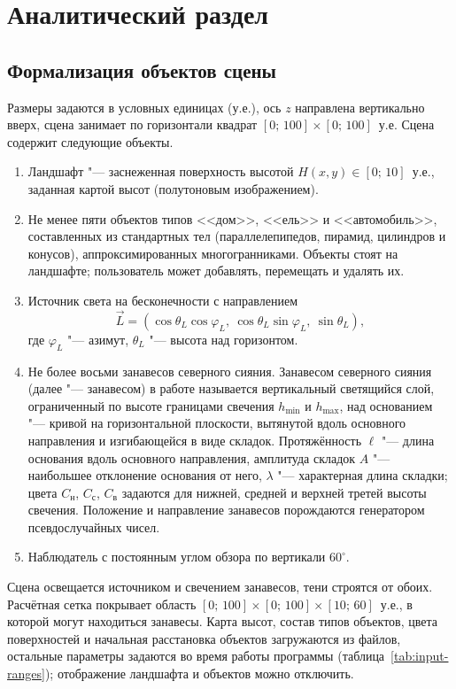 \chapter{Аналитический раздел}

\section{Формализация объектов сцены}

Размеры задаются в условных единицах (у.е.), ось $z$ направлена вертикально вверх, сцена занимает по горизонтали квадрат $[0;\,100] \times [0;\,100]$~у.е. Сцена содержит следующие объекты.
\begin{enumerate}
	\item Ландшафт "--- заснеженная поверхность высотой $H(x, y) \in [0;\,10]$~у.е., заданная картой высот (полутоновым изображением).
	\item Не менее пяти объектов типов <<дом>>, <<ель>> и <<автомобиль>>, составленных из стандартных тел (параллелепипедов, пирамид, цилиндров и конусов), аппроксимированных многогранниками. Объекты стоят на ландшафте; пользователь может добавлять, перемещать и удалять их.
	\item Источник света на бесконечности с направлением
	\begin{equation}
		\vec{L} = (\cos\theta_L \cos\varphi_L,\ \cos\theta_L \sin\varphi_L,\ \sin\theta_L),
		\label{eq:light-dir}
	\end{equation}
	где $\varphi_L$ "--- азимут, $\theta_L$ "--- высота над горизонтом.
	\item Не более восьми занавесов северного сияния. Занавесом северного сияния (далее "--- занавесом) в работе называется вертикальный светящийся слой, ограниченный по высоте границами свечения $h_{\min}$ и $h_{\max}$, над основанием "--- кривой на горизонтальной плоскости, вытянутой вдоль основного направления и изгибающейся в виде складок. Протяжённость $\ell$ "--- длина основания вдоль основного направления, амплитуда складок $A$ "--- наибольшее отклонение основания от него, $\lambda$ "--- характерная длина складки; цвета $C_{\text{н}}$, $C_{\text{с}}$, $C_{\text{в}}$ задаются для нижней, средней и верхней третей высоты свечения. Положение и направление занавесов порождаются генератором псевдослучайных чисел.
	\item Наблюдатель с постоянным углом обзора по вертикали $60^\circ$.
\end{enumerate}

Сцена освещается источником и свечением занавесов, тени строятся от обоих. Расчётная сетка покрывает область $[0;\,100] \times [0;\,100] \times [10;\,60]$~у.е., в которой могут находиться занавесы. Карта высот, состав типов объектов, цвета поверхностей и начальная расстановка объектов загружаются из файлов, остальные параметры задаются во время работы программы (таблица~\ref{tab:input-ranges}); отображение ландшафта и объектов можно отключить.

